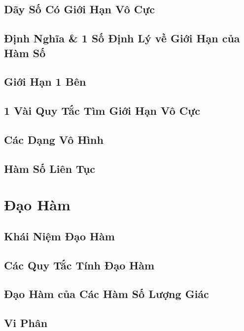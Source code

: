 \documentclass[oneside]{book}
\numberwithin{equation}{section}
\begin{document}
\section{Dãy Số Có Giới Hạn Vô Cực}

\section{Định Nghĩa \& 1 Số Định Lý về Giới Hạn của Hàm Số}

\section{Giới Hạn 1 Bên}

\section{1 Vài Quy Tắc Tìm Giới Hạn Vô Cực}

\section{Các Dạng Vô Hình}

\section{Hàm Số Liên Tục}


\chapter{Đạo Hàm}

\section{Khái Niệm Đạo Hàm}

\section{Các Quy Tắc Tính Đạo Hàm}

\section{Đạo Hàm của Các Hàm Số Lượng Giác}

\section{Vi Phân}
\end{document}
